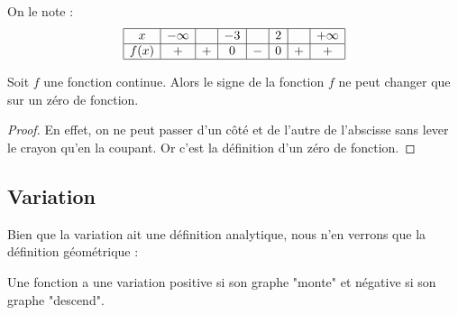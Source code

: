 \begin{exemple}
On le note :
$$
\begin{array}{|c|c|c|c|c|c|c|c|}
\hline
x & -\infty & & -3 & & 2 & & +\infty \\
\hline
f(x) & + & + & 0 & - & 0 & + & + \\
\hline
\end{array}
$$
\end{exemple}

\begin{theoreme}
Soit $f$ une fonction continue. Alors le signe de la fonction $f$ ne peut changer que sur un zéro de fonction.
\end{theoreme}

\begin{proof}
En effet, on ne peut passer d'un côté et de l'autre de l'abscisse sans lever le crayon qu'en la coupant. Or c'est la définition d'un zéro de fonction.
\end{proof}

\subsection{Variation}

Bien que la variation ait une définition analytique, nous n'en verrons que la définition géométrique :

\begin{definition}
Une fonction a une variation positive si son graphe "monte" et négative si son graphe "descend".
\end{definition}

